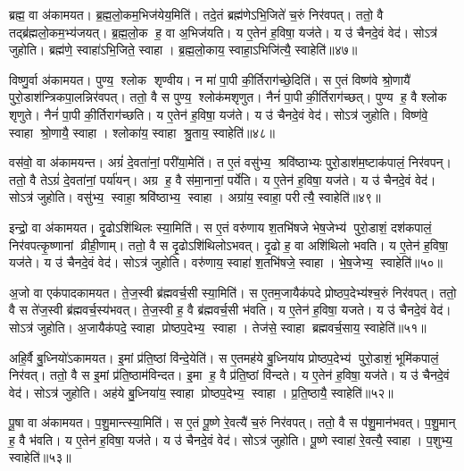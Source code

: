 ब्रह्म॒ वा अ॑कामयत।
ब्र॒ह्म॒लो॒कम॒भिज॑येय॒मिति॑।
तदे॒तं ब्रह्म॑णेऽभि॒जिते॑ च॒रुं निर॑वपत्।
ततो॒ वै तद्ब्र॑ह्मलो॒कम॒भ्य॑जयत्।
ब्र॒ह्म॒लो॒क ह॒ वा अ॒भिज॑यति।
य ए॒तेन॑ ह॒विषा॒ यज॑ते।
य उ॑ चैनदे॒वं वेद॑।
सोऽत्र॑ जुहोति।
ब्रह्म॑णे॒ स्वाहा॑ऽभि॒जिते॒ स्वाहा।
ब्र॒ह्म॒लो॒काय॒ स्वाहा॒ऽभिजि॑त्यै॒ स्वाहेति॑॥४७॥

विष्णु॒र्वा अ॑कामयत।
पुण्य॒ श्लोक शृण्वीय।
न मा॑ पा॒पी की॒र्तिराग॑च्छे॒दिति॑।
स ए॒तं विष्ण॑वे श्रो॒णायै॑ पुरो॒डाश॑न्त्रिकपा॒लन्निर॑वपत्।
ततो॒ वै स पुण्य॒ श्लोक॑मशृणुत।
नैनं॑ पा॒पी की॒र्तिराग॑च्छत्।
पुण्य ह॒ वै श्लोक शृणुते।
नैनं॑ पा॒पी की॒र्तिराग॑च्छति।
य ए॒तेन॑ ह॒विषा॒ यज॑ते।
य उ॑ चैनदे॒वं वेद॑।
सोऽत्र॑ जुहोति।
विष्ण॑वे॒ स्वाहा श्रो॒णायै॒ स्वाहा।
श्लोका॑य॒ स्वाहा श्रु॒ताय॒ स्वाहेति॑॥४८॥

वस॑वो॒ वा अ॑कामयन्त।
अग्रं॑ दे॒वता॑नां॒ परी॑या॒मेति॑।
त ए॒तं वसु॑भ्य॒ श्रवि॑ष्ठाभ्यः पुरो॒डाश॑म॒ष्टाक॑पालं॒ निर॑वपन्।
ततो॒ वै तेऽग्रं॑ दे॒वता॑नां॒ पर्या॑यन्।
अग्र ह॒ वै स॑मा॒नानां॒ पर्ये॑ति।
य ए॒तेन॑ ह॒विषा॒ यज॑ते।
य उ॑ चैनदे॒वं वेद॑।
सोऽत्र॑ जुहोति।
वसु॑भ्य॒ स्वाहा॒ श्रवि॑ष्ठाभ्य॒ स्वाहा।
अग्रा॑य॒ स्वाहा॒ परीत्यै॒ स्वाहेति॑॥४९॥

इन्द्रो॒ वा अ॑कामयत।
दृ॒ढोऽशि॑थिलः स्या॒मिति॑।
स ए॒तं वरु॑णाय श॒तभि॑षजे भेष॒जेभ्य॑ पुरो॒डाशं॒ दश॑कपालं॒ निर॑वपत्कृ॒ष्णानां व्रीही॒णाम्।
ततो॒ वै स दृ॒ढोऽशि॑थिलोऽभवत्।
दृ॒ढो ह॒ वा अशि॑थिलो भवति।
य ए॒तेन॑ ह॒विषा॒ यज॑ते।
य उ॑ चैनदे॒वं वेद॑।
सोऽत्र॑ जुहोति।
वरु॑णाय॒ स्वाहा॑ श॒तभि॑षजे॒ स्वाहा।
भे॒ष॒जेभ्य॒ स्वाहेति॑॥५०॥

अ॒जो वा एक॑पादकामयत।
ते॒ज॒स्वी ब्र॑ह्मवर्च॒सी स्या॒मिति॑।
स ए॒तम॒जायैक॑पदे प्रोष्ठप॒देभ्य॑श्च॒रुं निर॑वपत्।
ततो॒ वै स ते॑ज॒स्वी ब्र॑ह्मवर्च॒स्य॑भवत्।
ते॒ज॒स्वी ह॒ वै ब्र॑ह्मवर्च॒सी भ॑वति।
य ए॒तेन॑ ह॒विषा॒ यजते।
य उ॑ चैनदे॒वं वेद॑।
सोऽत्र॑ जुहोति।
अ॒जायैक॑पदे॒ स्वाहा प्रोष्ठप॒देभ्य॒ स्वाहा।
तेज॑से॒ स्वाहा ब्रह्मवर्च॒साय॒ स्वाहेति॑॥५१॥

अहि॒र्वै बु॒ध्नियो॑ऽकामयत।
इ॒मां प्र॑ति॒ष्ठां वि॑न्दे॒येति॑।
स ए॒तमह॑ये बु॒ध्निया॑य प्रोष्ठप॒देभ्य॑ पुरो॒डाशं॒ भूमि॑कपालं॒ निर॑वत्।
ततो॒ वै स इ॒मां प्र॑ति॒ष्ठाम॑विन्दत।
इ॒मा ह॒ वै प्र॑ति॒ष्ठां वि॑न्दते।
य ए॒तेन॑ ह॒विषा॒ यज॑ते।
य उ॑ चैनदे॒वं वेद॑।
सोऽत्र॑ जुहोति।
अह॑ये बु॒ध्निया॑य॒ स्वाहा प्रोष्ठप॒देभ्य॒ स्वाहा।
प्र॒ति॒ष्ठायै॒ स्वाहेति॑॥५२॥

पू॒षा वा अ॑कामयत।
प॒शु॒मान्त्स्या॒मिति॑।
स ए॒तं पू॒ष्णे रे॒वत्यै॑ च॒रुं निर॑वपत्।
ततो॒ वै स प॑शु॒मान॑भवत्।
प॒शु॒मान् ह॒ वै भ॑वति।
य ए॒तेन॑ ह॒विषा॒ यज॑ते।
य उ॑ चैनदे॒वं वेद॑।
सोऽत्र॑ जुहोति।
पू॒ष्णे स्वाहा॑ रे॒वत्यै॒ स्वाहा।
प॒शुभ्य॒ स्वाहेति॑॥५३॥

